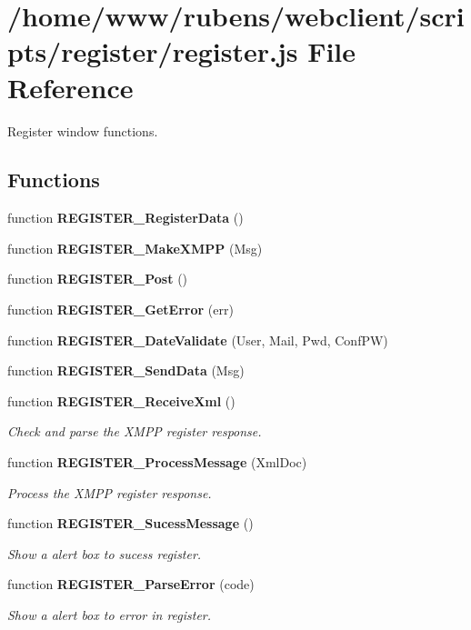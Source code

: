 \section{/home/www/rubens/webclient/scripts/register/register.js File Reference}
\label{register_8js}
Register window functions. 

\subsection*{Functions}
\begin{CompactItemize}
\item 
function {\bf REGISTER\_\-RegisterData} ()
\item 
function {\bf REGISTER\_\-MakeXMPP} (Msg)
\item 
function {\bf REGISTER\_\-Post} ()
\item 
function {\bf REGISTER\_\-GetError} (err)
\item 
function {\bf REGISTER\_\-DateValidate} (User, Mail, Pwd, ConfPW)
\item 
function {\bf REGISTER\_\-SendData} (Msg)
\item 
function {\bf REGISTER\_\-ReceiveXml} ()
\begin{CompactList}\small\item\em Check and parse the XMPP register response. \item\end{CompactList}\item 
function {\bf REGISTER\_\-ProcessMessage} (XmlDoc)
\begin{CompactList}\small\item\em Process the XMPP register response. \item\end{CompactList}\item 
function {\bf REGISTER\_\-SucessMessage} ()
\begin{CompactList}\small\item\em Show a alert box to sucess register. \item\end{CompactList}\item 
function {\bf REGISTER\_\-ParseError} (code)
\begin{CompactList}\small\item\em Show a alert box to error in register. \item\end{CompactList}\item 

\end{CompactItemize}
